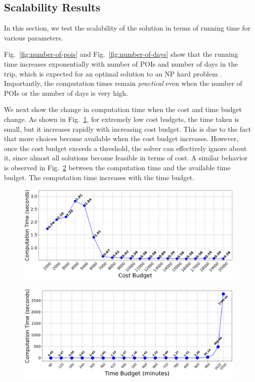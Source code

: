 \subsection{Scalability Results}
\label{sec:exp scalability}

In this section, we test the scalability of the \trip solution in terms of running time for various parameters.

Fig.~\ref{fig:number-of-pois} and Fig.~\ref{fig:number-of-days} show that the running time increases exponentially with number of POIs and number of days in the trip, which is expected for an optimal solution to an NP hard problem .
Importantly, the computation times remain \emph{practical} even when the number of POIs or the number of days is very high.

We next show the change in computation time when the cost and time budget change.
As shown in Fig.~\ref{fig:cost-budget}, for extremely low cost budgets, the time taken is small, but it increases rapidly with increasing cost budget. This is due to the fact that more choices become available when the cost budget increases. However, once the cost budget exceeds a threshold, the solver can effectively ignore about it, since almost all solutions become feasible in terms of cost.
A similar behavior is observed in Fig.~\ref{fig:time-budget} between the computation time and the available time budget. The computation time increases with the time budget.

\begin{figure}[t]
    \centering
    \includegraphics[width=\figwidth]{plots/costbudgetvstoc.png}
    \label{fig:cost-budget}
\end{figure}

\begin{figure}[t]
    \centering
    \includegraphics[width=\figwidth]{plots/timebudgetvstoc.png}
    \label{fig:time-budget}
\end{figure}

